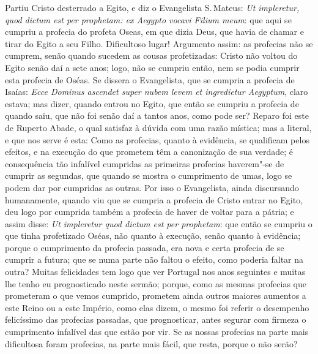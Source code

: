 Partiu Cristo desterrado a Egito, e diz o Evangelista S.\,Mateus:
\emph{Ut impleretur, quod dictum est per prophetam: ex Aegypto vocavi
Filium meum}: que aqui se cumpriu a profecia do profeta Oseas, em que
dizia Deus, que havia de chamar e tirar do Egito a seu Filho.
Dificultoso lugar! Argumento assim: as profecias não se cumprem, senão
quando sucedem as cousas profetizadas: Cristo não voltou do Egito senão
daí a sete anos; logo, não se cumpriu então, nem se podia cumprir esta
profecia de Oséas. Se dissera o Evangelista, que se cumpria a profecia
de Isaías: \emph{Ecce Dominus ascendet super nubem levem et ingredietur
Aegyptum}, claro estava; mas dizer, quando entrou no Egito, que então se
cumpriu a profecia de quando saiu, que não foi senão daí a tantos anos,
como pode ser? Reparo foi este de Ruperto Abade, o qual satisfaz à
dúvida com uma razão mística; mas a literal, e que nos serve é esta:
Como as profecias, quanto à evidência, se qualificam pelos efeitos, e na
execução do que prometem têm a canonização de sua verdade; é
consequência tão infalível cumpridas as primeiras profecias haverem"-se
de cumprir as segundas, que quando se mostra o cumprimento de umas, logo
se podem dar por cumpridas as outras. Por isso o Evangelista, ainda
discursando humanamente, quando viu que se cumpria a profecia de Cristo
entrar no Egito, deu logo por cumprida também a profecia de haver de
voltar para a pátria; e assim disse: \emph{Ut impleretur quod dictum est
per prophetam}: que então se cumpriu o que tinha profetizado Oséas, não
quanto à execução, senão quanto à evidência; porque o cumprimento da
profecia passada, era nova e certa profecia de se cumprir a futura; que
se numa parte não faltou o efeito, como poderia faltar na outra? Muitas
felicidades tem logo que ver Portugal nos anos seguintes e muitas lhe
tenho eu prognosticado neste sermão; porque, como as mesmas profecias
que prometeram o que vemos cumprido, prometem ainda outros maiores
aumentos a este Reino ou a este Império, como elas dizem, o mesmo foi
referir o desempenho felicíssimo das profecias passadas, que
prognosticar, antes segurar com firmeza o cumprimento infalível das que
estão por vir. Se as nossas profecias na parte mais dificultosa foram
profecias, na parte mais fácil, que resta, porque o não serão?

